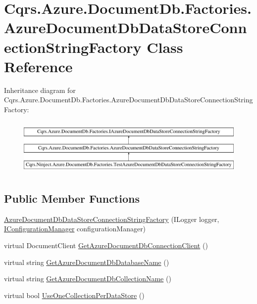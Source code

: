 \hypertarget{classCqrs_1_1Azure_1_1DocumentDb_1_1Factories_1_1AzureDocumentDbDataStoreConnectionStringFactory}{}\section{Cqrs.\+Azure.\+Document\+Db.\+Factories.\+Azure\+Document\+Db\+Data\+Store\+Connection\+String\+Factory Class Reference}
\label{classCqrs_1_1Azure_1_1DocumentDb_1_1Factories_1_1AzureDocumentDbDataStoreConnectionStringFactory}
Inheritance diagram for Cqrs.\+Azure.\+Document\+Db.\+Factories.\+Azure\+Document\+Db\+Data\+Store\+Connection\+String\+Factory\+:\begin{figure}[H]
\begin{center}
\leavevmode
\includegraphics[height=2.847458cm]{classCqrs_1_1Azure_1_1DocumentDb_1_1Factories_1_1AzureDocumentDbDataStoreConnectionStringFactory}
\end{center}
\end{figure}
\subsection*{Public Member Functions}
\begin{DoxyCompactItemize}
\item 
\hyperlink{classCqrs_1_1Azure_1_1DocumentDb_1_1Factories_1_1AzureDocumentDbDataStoreConnectionStringFactory_a9b08d89df792a20e71f5278dbf39b804}{Azure\+Document\+Db\+Data\+Store\+Connection\+String\+Factory} (I\+Logger logger, \hyperlink{interfaceCqrs_1_1Configuration_1_1IConfigurationManager}{I\+Configuration\+Manager} configuration\+Manager)
\item 
virtual Document\+Client \hyperlink{classCqrs_1_1Azure_1_1DocumentDb_1_1Factories_1_1AzureDocumentDbDataStoreConnectionStringFactory_a0525c318c3930076e08ed83f9829ab2c}{Get\+Azure\+Document\+Db\+Connection\+Client} ()
\item 
virtual string \hyperlink{classCqrs_1_1Azure_1_1DocumentDb_1_1Factories_1_1AzureDocumentDbDataStoreConnectionStringFactory_a2a30d6066e2bc9c4af078b1f0a5407ab}{Get\+Azure\+Document\+Db\+Database\+Name} ()
\item 
virtual string \hyperlink{classCqrs_1_1Azure_1_1DocumentDb_1_1Factories_1_1AzureDocumentDbDataStoreConnectionStringFactory_a0685593d04e9a905d270800c278ddb42}{Get\+Azure\+Document\+Db\+Collection\+Name} ()
\item 
virtual bool \hyperlink{classCqrs_1_1Azure_1_1DocumentDb_1_1Factories_1_1AzureDocumentDbDataStoreConnectionStringFactory_a736e0967785b1391ec21989a3f005c01}{Use\+One\+Collection\+Per\+Data\+Store} ()
\end{DoxyCompactItemize}
